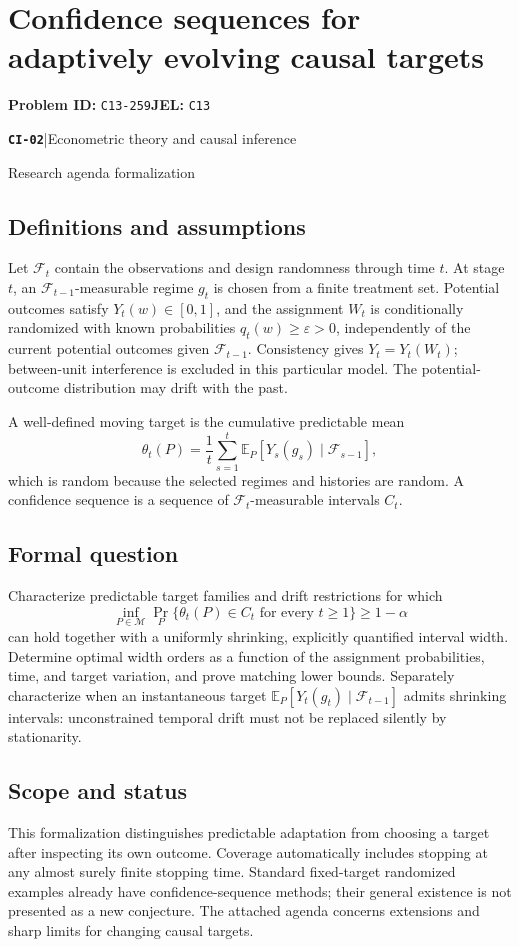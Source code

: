 \documentclass[11pt,a4paper]{article}
\newcommand{\E}{\mathbb E}
\newcommand{\entrymeta}[3]{{\sffamily\small\color{muted}\textbf{\texttt{#1}}\quad|\quad #2\par #3\par}}
\begin{document}
\section*{Confidence sequences for adaptively evolving causal targets}
\textbf{Problem ID:} \texttt{C13-259}\quad \textbf{JEL:} \texttt{C13}\par
\label{problem:OP-0481}
\label{beyond:CI-02}
\entrymeta{CI-02}{Econometric theory and causal inference}{Research agenda formalization}
\subsection*{Definitions and assumptions}
Let $\mathcal F_t$ contain the observations and design randomness through time $t$. At stage $t$, an $\mathcal F_{t-1}$-measurable regime $g_t$ is chosen from a finite treatment set. Potential outcomes satisfy $Y_t(w)\in[0,1]$, and the assignment $W_t$ is conditionally randomized with known probabilities $q_t(w)\geq\varepsilon>0$, independently of the current potential outcomes given $\mathcal F_{t-1}$. Consistency gives $Y_t=Y_t(W_t)$; between-unit interference is excluded in this particular model. The potential-outcome distribution may drift with the past.

A well-defined moving target is the cumulative predictable mean
\[
\theta_t(P)=\frac1t\sum_{s=1}^t
 \E_P[Y_s(g_s)\mid\mathcal F_{s-1}],
\]
which is random because the selected regimes and histories are random. A confidence sequence is a sequence of $\mathcal F_t$-measurable intervals $C_t$.
\subsection*{Formal question}
Characterize predictable target families and drift restrictions for which
\[
\inf_{P\in\mathcal M}\Pr_P\{\theta_t(P)\in C_t
                 \text{ for every }t\geq1\}\geq1-\alpha
\]
can hold together with a uniformly shrinking, explicitly quantified interval width. Determine optimal width orders as a function of the assignment probabilities, time, and target variation, and prove matching lower bounds. Separately characterize when an instantaneous target $\E_P[Y_t(g_t)\mid\mathcal F_{t-1}]$ admits shrinking intervals: unconstrained temporal drift must not be replaced silently by stationarity.
\subsection*{Scope and status}
This formalization distinguishes predictable adaptation from choosing a target after inspecting its own outcome. Coverage automatically includes stopping at any almost surely finite stopping time. Standard fixed-target randomized examples already have confidence-sequence methods; their general existence is not presented as a new conjecture. The attached agenda concerns extensions and sharp limits for changing causal targets.
\end{document}
